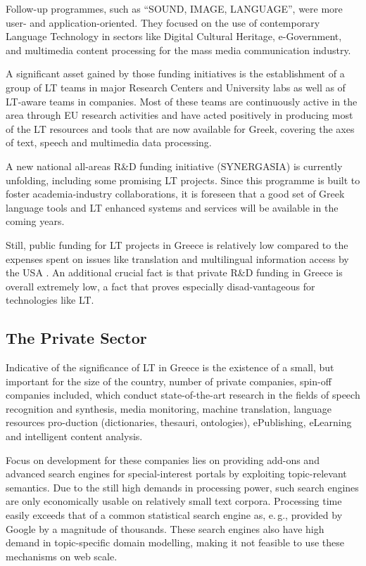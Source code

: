 \begin{multicols}{2}
Follow-up programmes, such as “SOUND, IMAGE, LANGUAGE”, were more user- and application-oriented. They focused on the use of contemporary Language Technology in sectors like Digital Cultural Heritage, e-Government, and multimedia content processing for the mass media communication industry.

A significant asset gained by those funding initiatives is the establishment of a group of LT teams in major Research Centers and University labs as well as of LT-aware teams in companies. Most of these teams are continuously active in the area through EU research activities and have acted positively in producing most of the LT resources and tools that are now available for Greek, covering the axes of text, speech and multimedia data processing.

A new national all-areas R\&D funding initiative (SYNERGASIA) is currently unfolding, including some promising LT projects. Since this programme is built to foster academia-industry collaborations, it is foreseen that a good set of Greek language tools and LT enhanced systems and services will be available in the coming years.

Still, public funding for LT projects in Greece is relatively low compared to the expenses spent on issues like translation and multilingual information access by the USA \cite{laz2}. An additional crucial fact is that private R\&D funding in Greece is overall extremely low, a fact that proves especially disad-vantageous for technologies like LT.

\subsection{The Private Sector}

Indicative of the significance of LT in Greece is the existence of a small, but important for the size of the country, number of private companies, spin-off companies included, which conduct state-of-the-art research in the fields of speech recognition and synthesis, media monitoring, machine translation, language resources pro-duction (dictionaries, thesauri, ontologies), ePublishing, eLearning and intelligent content analysis.

Focus on development for these companies lies on providing add-ons and advanced search engines for special-interest portals by exploiting topic-relevant semantics. Due to the still high demands in processing power, such search engines are only economically usable on relatively small text corpora. Processing time easily exceeds that of a common statistical search engine as, e.\,g., provided by Google by a magnitude of thousands. These search engines also have high demand in topic-specific domain modelling, making it not feasible to use these mechanisms on web scale.


\end{multicols}
